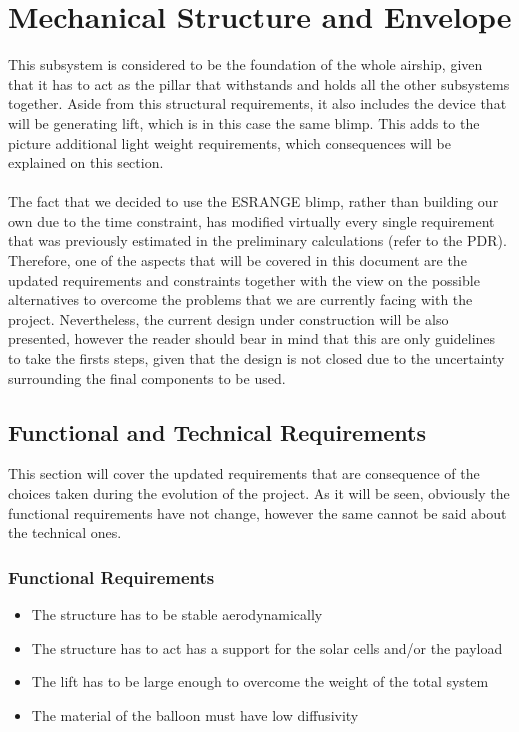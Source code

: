 \chapter{Mechanical Structure and Envelope}
\label{chap:mse}

This subsystem is considered to be the foundation of the whole airship, given that it has to act as the pillar that withstands and holds all the other subsystems together. Aside from this structural requirements, it also includes the device that will be generating lift, which is in this case the same blimp. This adds to the picture additional light weight requirements, which consequences will be explained on this section.
\\ 
\\
The fact that we decided to use the ESRANGE blimp, rather than building our own due to the time constraint, has modified virtually every single requirement that was previously estimated in the preliminary calculations (refer to the \ac{PDR}). Therefore, one of the aspects that will be covered in this document are the updated requirements and constraints together with the view on the possible alternatives to overcome the problems that we are currently facing with the project. Nevertheless, the current design under construction will be also presented, however the reader should bear in mind that this are only guidelines to take the firsts steps, given that the design is not closed due to the uncertainty surrounding the final components to be used. 

\section{Functional and Technical Requirements}

This section will cover the updated requirements that are consequence of the choices taken during the evolution of the project. As it will be seen, obviously the functional requirements have not change, however the same cannot be said about the technical ones. 

\pagebreak

\subsection{Functional Requirements}

\begin{itemize}
\item The structure has to be stable aerodynamically
\item The structure has to act has a support for the solar cells and/or the payload
\item The lift has to be large enough to overcome the weight of the total system
\item The material of the balloon must have low diffusivity
\end{itemize}


